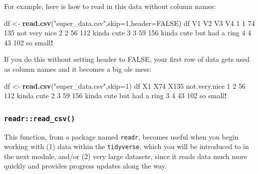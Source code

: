 \documentclass[
]{book}
\newenvironment{Shaded}{\begin{snugshade}}{\end{snugshade}}
\newcommand{\DataTypeTok}[1]{\textcolor[rgb]{0.13,0.29,0.53}{#1}}
\newcommand{\DecValTok}[1]{\textcolor[rgb]{0.00,0.00,0.81}{#1}}
\newcommand{\KeywordTok}[1]{\textcolor[rgb]{0.13,0.29,0.53}{\textbf{#1}}}
\newcommand{\NormalTok}[1]{#1}
\newcommand{\OperatorTok}[1]{\textcolor[rgb]{0.81,0.36,0.00}{\textbf{#1}}}
\newcommand{\OtherTok}[1]{\textcolor[rgb]{0.56,0.35,0.01}{#1}}
\newcommand{\StringTok}[1]{\textcolor[rgb]{0.31,0.60,0.02}{#1}}
\begin{document}
For example, here is how to read in this data without column names:

\begin{Shaded}
\begin{Highlighting}[]
\NormalTok{df <-}\StringTok{ }\KeywordTok{read.csv}\NormalTok{(}\StringTok{"super_data.csv"}\NormalTok{,}\DataTypeTok{skip=}\DecValTok{1}\NormalTok{,}\DataTypeTok{header=}\OtherTok{FALSE}\NormalTok{)}
\NormalTok{df}
\NormalTok{  V1 V2  V3                        V4}
\DecValTok{1}  \DecValTok{1} \DecValTok{74} \DecValTok{135}\NormalTok{             not very nice}
\DecValTok{2}  \DecValTok{2} \DecValTok{56} \DecValTok{112}\NormalTok{                kinda cute}
\DecValTok{3}  \DecValTok{3} \DecValTok{59} \DecValTok{156}\NormalTok{ kinda cute but had a ring}
\DecValTok{4}  \DecValTok{4} \DecValTok{43} \DecValTok{102}\NormalTok{                 so small}\OperatorTok{!}
\end{Highlighting}
\end{Shaded}

If you do this without setting header to FALSE, your first row of data gets used as column names and it becomes a big ole mess:

\begin{Shaded}
\begin{Highlighting}[]
\NormalTok{df <-}\StringTok{ }\KeywordTok{read.csv}\NormalTok{(}\StringTok{"super_data.csv"}\NormalTok{,}\DataTypeTok{skip=}\DecValTok{1}\NormalTok{)}
\NormalTok{df}
\NormalTok{  X1 X74 X135             not.very.nice}
\DecValTok{1}  \DecValTok{2}  \DecValTok{56}  \DecValTok{112}\NormalTok{                kinda cute}
\DecValTok{2}  \DecValTok{3}  \DecValTok{59}  \DecValTok{156}\NormalTok{ kinda cute but had a ring}
\DecValTok{3}  \DecValTok{4}  \DecValTok{43}  \DecValTok{102}\NormalTok{                 so small}\OperatorTok{!}
\end{Highlighting}
\end{Shaded}

\hypertarget{readrread_csv}{%
\subsubsection*{\texorpdfstring{\texttt{readr::read\_csv()}}{readr::read\_csv()}}\label{readrread_csv}}

This function, from a package named \texttt{readr}, becomes useful when you begin working with (1) data within the \texttt{tidyverse}, which you will be introduced to in the next module, and/or (2) very large datasete, since it reads data much more quickly and provides progress updates along the way.
\end{document}
